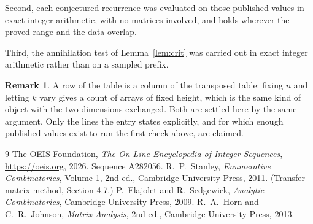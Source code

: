 \documentclass[11pt,a4paper]{article}
\theoremstyle{plain}
\theoremstyle{definition}
\newtheorem{remark}[theorem]{Remark}
\begin{document}
Second, each conjectured recurrence was evaluated on those published values in exact
integer arithmetic, with no matrices involved, and holds wherever the proved range and the
data overlap.

Third, the annihilation test of Lemma~\ref{lem:crit} was carried out in exact integer
arithmetic rather than on a sampled prefix.

\begin{remark}
A row of the table is a column of the transposed table: fixing $n$ and letting $k$ vary gives a
count of arrays of fixed height, which is the same kind of object with the two dimensions
exchanged. Both are settled here by the same argument. Only the lines the entry states
explicitly, and for which enough published values exist to run the first check above, are
claimed.
\end{remark}

\begin{thebibliography}{9}
 The OEIS Foundation, \emph{The On-Line Encyclopedia of Integer
Sequences}, \url{https://oeis.org}, 2026. Sequence A282056.
 R.~P.~Stanley, \emph{Enumerative Combinatorics}, Volume 1, 2nd ed.,
Cambridge University Press, 2011. (Transfer-matrix method, Section 4.7.)
 P.~Flajolet and R.~Sedgewick, \emph{Analytic Combinatorics}, Cambridge
University Press, 2009.
 R.~A.~Horn and C.~R.~Johnson, \emph{Matrix Analysis}, 2nd ed., Cambridge
University Press, 2013.
\end{thebibliography}
\end{document}
